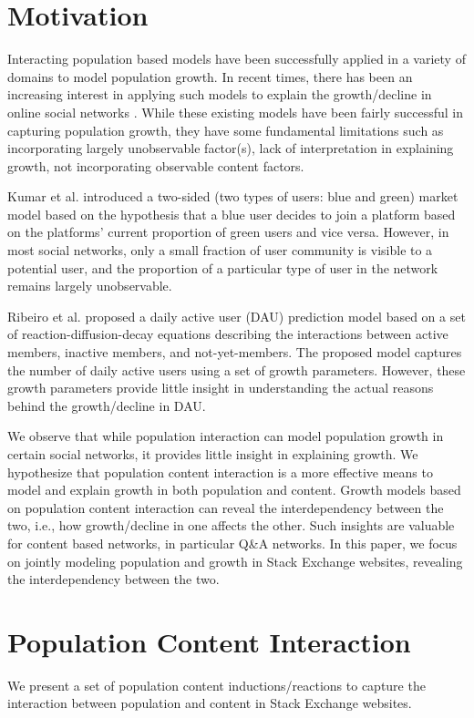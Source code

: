 \section{Motivation}
Interacting population based models have been successfully applied in a variety of domains to model population growth. In recent times, there has been an increasing interest in applying such models to explain the growth/decline in online social networks \cite{Ribeiro2014,Kumar2010}. While these existing models have been fairly successful in capturing population growth, they have some fundamental limitations such as incorporating largely unobservable factor(s), lack of interpretation in explaining growth, not incorporating observable content factors. %

Kumar et al. \cite{Kumar2010} introduced a two-sided (two types of users: blue and green) market model based on the hypothesis that a blue user decides to join a platform based on the platforms' current proportion of green users and vice versa. However, in most social networks, only a small fraction of user community is visible to a potential user, and the proportion of a particular type of user in the network remains largely unobservable. 

Ribeiro et al. \cite{Ribeiro2014} proposed a daily active user (DAU) prediction model based on a set of reaction-diffusion-decay equations describing the interactions between active members, inactive members, and not-yet-members. The proposed model captures the number of daily active users using a set of growth parameters. However, these growth parameters provide little insight in understanding the actual reasons behind the growth/decline in DAU. 

We observe that while population interaction can model population growth in certain social networks, it provides little insight in explaining growth. We hypothesize that population content interaction is a more effective means to model and explain growth in both population and content. Growth models based on population content interaction can reveal the interdependency between the two, i.e., how growth/decline in one affects the other. Such insights are valuable for content based networks, in particular Q\&A networks. In this paper, we focus on jointly modeling population and growth in Stack Exchange websites, revealing the interdependency between the two.

\section{Population Content Interaction}
We present a set of population content inductions/reactions to capture the interaction between population and content in Stack Exchange websites. %


